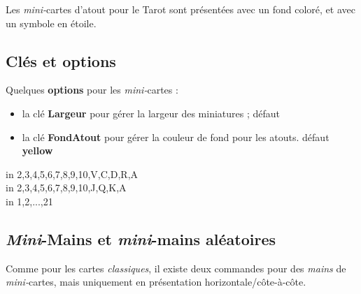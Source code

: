 \documentclass[a4paper]{article}
\newcommand\Cle[1]{{\bfseries\sffamily\textlangle #1\textrangle}}
\begin{document}
\begin{codeinfo}
Les \textit{mini-}cartes d'atout pour le Tarot sont présentées avec un fond coloré, et avec un symbole en étoile.
\end{codeinfo}

\subsection{Clés et options}

\begin{codecles}
Quelques \Cle{options} pour les \textit{mini-}cartes :

\begin{itemize}[leftmargin=*,label={\tiny\faTools}]
  \item la clé \Cle{Largeur} pour gérer la largeur des miniatures ; \hfill{}défaut \Cle{0.55cm}
  \item la clé \Cle{FondAtout} pour gérer la couleur de fond pour les atouts. \hfill{}défaut \Cle{yellow}
\end{itemize}
\end{codecles}

\begin{codetex}[]
\foreach \EECARTE in {2,3,4,5,6,7,8,9,10,V,C,D,R,A}{}\\
\foreach \EECARTE in {2,3,4,5,6,7,8,9,10,J,Q,K,A}{}\\
%
\foreach \EECARTE in {1,2,...,21}{}
\end{codetex}

\subsection{\textit{Mini}-Mains et \textit{mini}-mains aléatoires}

\begin{codeidee}
Comme pour les cartes \textit{classiques}, il existe deux commandes pour des \textit{mains} de \textit{mini-}cartes, mais uniquement en présentation horizontale/côte-à-côte.
\end{codeidee}

\begin{codetex}

\end{codetex}
\end{document}
